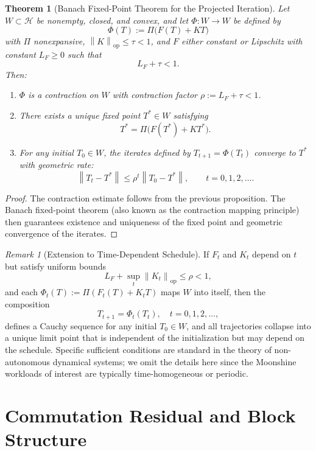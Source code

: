 \documentclass[11pt]{article}
\theoremstyle{definition}
\theoremstyle{plain}
\newtheorem{theorem}[definition]{Theorem}
\theoremstyle{remark}
\newtheorem{remark}[definition]{Remark}
\newcommand{\Hcal}{\mathcal{H}}
\newcommand{\norm}[1]{\left\lVert #1 \right\rVert}
\begin{document}
\begin{theorem}[Banach Fixed-Point Theorem for the Projected Iteration]
Let \(W \subset \Hcal\) be nonempty, closed, and convex, and let \(\Phi : W \to W\) be defined by
\[
  \Phi(T) := \Pi\bigl(F(T) + K T\bigr)
\]
with \(\Pi\) nonexpansive, \(\norm{K}_{\mathrm{op}} \le \tau < 1\), and \(F\) either constant or Lipschitz with constant \(L_F \ge 0\) such that
\[
  L_F + \tau < 1.
\]
Then:
\begin{enumerate}
  \item \(\Phi\) is a contraction on \(W\) with contraction factor \(\rho := L_F + \tau < 1\).
  \item There exists a unique fixed point \(T^* \in W\) satisfying
  \[
    T^* = \Pi\bigl(F(T^*) + K T^*\bigr).
  \]
  \item For any initial \(T_0 \in W\), the iterates defined by \(T_{t+1} = \Phi(T_t)\) converge to \(T^*\) with geometric rate:
  \[
    \norm{T_t - T^*} \le \rho^t \norm{T_0 - T^*},\qquad t = 0,1,2,\dots.
  \]
\end{enumerate}
\end{theorem}

\begin{proof}
The contraction estimate follows from the previous proposition.
The Banach fixed-point theorem (also known as the contraction mapping principle) then guarantees existence and uniqueness of the fixed point and geometric convergence of the iterates.
\end{proof}

\begin{remark}[Extension to Time-Dependent Schedule]
If \(F_t\) and \(K_t\) depend on \(t\) but satisfy uniform bounds
\[
  L_F + \sup_t \norm{K_t}_{\mathrm{op}} \le \rho < 1,
\]
and each \(\Phi_t(T) := \Pi(F_t(T) + K_t T)\) maps \(W\) into itself, then the composition
\[
  T_{t+1} = \Phi_t(T_t),\quad t=0,1,2,\dots,
\]
defines a Cauchy sequence for any initial \(T_0 \in W\), and all trajectories collapse into a unique limit point that is independent of the initialization but may depend on the schedule.
Specific sufficient conditions are standard in the theory of non-autonomous dynamical systems; we omit the details here since the Moonshine workloads of interest are typically time-homogeneous or periodic.
\end{remark}

\section{Commutation Residual and Block Structure}
\end{document}

